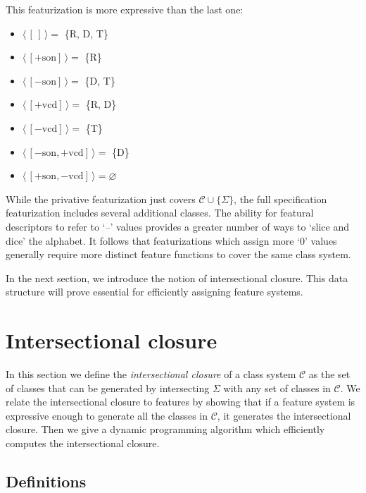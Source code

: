 \documentclass[11pt, oneside]{article}   	%
\begin{document}
\noindent This featurization is more expressive than the last one: \begin{itemize}
    \item $\langle \, [\,] \, \rangle =$ \{R, D, T\}
    \item $\langle \, [+\text{son}] \, \rangle =$ \{R\}
    \item $\langle \, [-\text{son}] \, \rangle =$ \{D, T\}
    \item $\langle \, [+\text{vcd}] \, \rangle =$ \{R, D\}
    \item $\langle \, [-\text{vcd}]  \, \rangle=$ \{T\}
    \item $\langle \, [-\text{son},+\text{vcd}] \, \rangle =$ \{D\}
    \item $\langle \, [+\text{son},-\text{vcd}] \, \rangle = \varnothing$
    \end{itemize}

\vspace{\baselineskip} \noindent While the privative featurization just covers $\mathcal C \cup \{\Sigma\}$, the full specification featurization includes several additional classes. The ability for featural descriptors to refer to `--' values provides a greater number of ways to `slice and dice' the alphabet. It follows that featurizations which assign more `$0$' values generally require more distinct feature functions to cover the same class system.

\vspace{\baselineskip} In the next section, we introduce the notion of intersectional closure. This data structure will prove essential for efficiently assigning feature systems.

\section{Intersectional closure}

In this section we define the \textit{intersectional closure} of a class system $\mathcal{C}$ as the set of classes that can be generated by intersecting $\Sigma$ with any set of classes in $\mathcal{C}$. We relate the intersectional closure to features by showing that if a feature system is expressive enough to generate all the classes in $\mathcal{C}$, it generates the intersectional closure. Then we give a dynamic programming algorithm which efficiently computes the intersectional closure. 

\subsection{Definitions}
\end{document}
